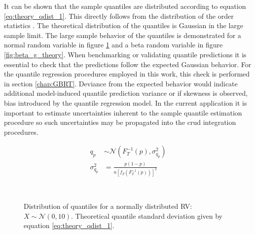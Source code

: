 It can be shown that the sample quantiles are distributed according to equation \ref{eq:theory_qdist_1}.  This directly follows from the distribution of the order statistics \cite{mosteller1946}.  The theoretical distribution of the quantiles is Gaussian in the large sample limit.  The large sample behavior of the quantiles is demonstrated for a normal random variable in figure \ref{fig:normal_q_theory} and a beta random variable in figure \ref{fig:beta_g_theory}.  When benchmarking or validating quantile predictions it is essential to check that the predictions follow the expected Gaussian behavior.  For the quantile regression procedures employed in this work, this check is performed in section \ref{chap:GBRT}.  Deviance from the expected behavior would indicate additional model-induced quantile prediction variance or if skewness is observed, bias introduced by the quantile regression model.  In the current application it is important to estimate uncertainties inherent to the sample quantile estimation procedure so such uncertainties may be propagated into the crud integration procedures.

\begin{align}
    q_p &\sim \mathcal N \left( F_T^{-1}(p), \sigma^2_{q_p} \right) \nonumber \\
    \sigma^2_{q_p} &= \frac{p(1 - p)}{n[f_T(F_T^{-1}(p))]^2}
    \label{eq:theory_qdist_1}
\end{align}


\begin{figure}[H]%
    \captionsetup[subfigure]{justification=centering}
    \centering
        \hspace*{-1.0em}%
        \hspace*{-1.0em}%
        \\
        \hspace*{-1.0em}%
    \qquad
    \caption[Distribution of quantiles for a normally distributed RV.]{Distribution of quantiles for a normally distributed RV: $X \sim \mathcal{N}(0, 10)$.  Theoretical quantile standard deviation given by equation \ref{eq:theory_qdist_1}.}%
    \label{fig:normal_q_theory}%
\end{figure}

